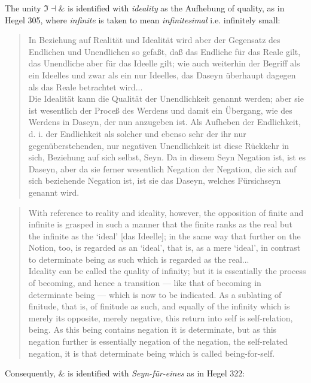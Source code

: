 \documentclass{article}
\begin{document}
The unity $\Im\dashv\&$ is identified with \emph{ideality} as the Aufhebung of quality, as in Hegel 305, where \emph{infinite} is taken to mean \emph{infinitesimal} i.e. infinitely small:

\begin{quote}
    In Beziehung auf Realität und Idealität wird aber der Gegensatz des Endlichen und Unendlichen so gefaßt, daß das Endliche für das Reale gilt, das Unendliche aber für das Ideelle gilt; wie auch weiterhin der Begriff als ein Ideelles und zwar als ein nur Ideelles, das Daseyn überhaupt dagegen als das Reale betrachtet wird... \\

    Die Idealität kann die Qualität der Unendlichkeit genannt werden; aber sie ist wesentlich der Proceß des Werdens und damit ein Übergang, wie des Werdens in Daseyn, der nun anzugeben ist. Als Aufheben der Endlichkeit, d. i. der Endlichkeit als solcher und ebenso sehr der ihr nur gegenüberstehenden, nur negativen Unendlichkeit ist diese Rückkehr in sich, Beziehung auf sich selbst, Seyn. Da in diesem Seyn Negation ist, ist es Daseyn, aber da sie ferner wesentlich Negation der Negation, die sich auf sich beziehende Negation ist, ist sie das Daseyn, welches Fürsichseyn genannt wird.
\end{quote}

\begin{quote}
    With reference to reality and ideality, however, the opposition of finite and infinite is grasped in such a manner that the finite ranks as the real but the infinite as the ‘ideal’ [das Ideelle]; in the same way that further on the Notion, too, is regarded as an ‘ideal’, that is, as a mere ‘ideal’, in contrast to determinate being as such which is regarded as the real... \\
    
    Ideality can be called the quality of infinity; but it is essentially the process of becoming, and hence a transition — like that of becoming in determinate being — which is now to be indicated. As a sublating of finitude, that is, of finitude as such, and equally of the infinity which is merely its opposite, merely negative, this return into self is self-relation, being. As this being contains negation it is determinate, but as this negation further is essentially negation of the negation, the self-related negation, it is that determinate being which is called being-for-self.
\end{quote}

Consequently, $\&$ is identified with \emph{Seyn-für-eines} as in Hegel 322:
\end{document}
